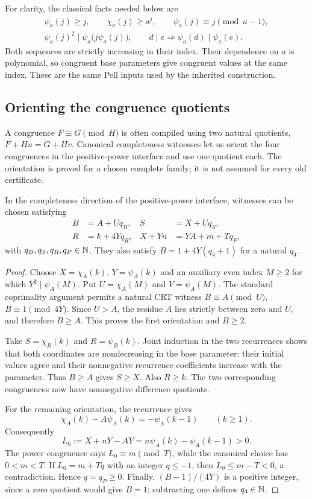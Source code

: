 For clarity, the classical facts needed below are
\begin{gather}
 \psi_a(j)\geq j,\qquad \chi_a(j)\geq a^j,\qquad
 \psi_a(j)\equiv j\pmod{a-1},\label{eq:sa-classical-bounds}\\
 \psi_a(j)^2\mid\psi_a\bigl(j\psi_a(j)\bigr),\qquad
 d\mid e\Longrightarrow\psi_a(d)\mid\psi_a(e).
 \label{eq:sa-classical-divisibility}
\end{gather}
Both sequences are strictly increasing in their index.  Their dependence
on $a$ is polynomial, so
congruent base parameters give congruent values at the same index.
These are the same Pell inputs used by the inherited construction.

\subsection{Orienting the congruence quotients}

A congruence $F\equiv G\pmod H$ is often compiled using two natural
quotients, $F+Hu=G+Hv$.  Canonical completeness witnesses let us orient
the four congruences in the positive-power interface and use one quotient
each.  The orientation is proved for a chosen complete family; it is not
assumed for every old certificate.

\begin{lemma}
\label{lem:sa-orientation}
In the completeness direction of the positive-power interface, witnesses
can be chosen satisfying
\begin{align*}
 B&=A+Uq_B,&S&=X+Uq_S,\\
 R&=k+4Yq_R,&X+Yn&=YA+m+Tq_P,
\end{align*}
with $q_B,q_S,q_R,q_P\in\mathbb N$.  They also satisfy
$B=1+4Y(q_4+1)$ for a natural $q_4$.
\end{lemma}

\begin{proof}
Choose $X=\chi_A(k)$, $Y=\psi_A(k)$ and an auxiliary even index
$M\geq2$ for which $Y^2\mid\psi_A(M)$.  Put
$U=\chi_A(M)$ and $V=\psi_A(M)$.  The standard coprimality argument
permits a natural CRT witness $B\equiv A\pmod U$,
$B\equiv1\pmod{4Y}$.  Since $U>A$, the residue $A$ lies strictly
between zero and $U$, and therefore $B\geq A$.
This proves the first orientation and $B\geq2$.

Take $S=\chi_B(k)$ and $R=\psi_B(k)$.  Joint induction in the two
recurrences shows that both coordinates are nondecreasing in the base
parameter: their initial values agree and their nonnegative recurrence
coefficients increase with the parameter.  Thus $B\geq A$ gives
$S\geq X$.  Also $R\geq k$.  The two corresponding congruences now
have nonnegative difference quotients.

For the remaining orientation, the recurrence gives
\[
 \chi_A(k)-A\psi_A(k)=-\psi_A(k-1)\qquad(k\geq1).
\]
Consequently
\[
 L_0:=X+nY-AY=n\psi_A(k)-\psi_A(k-1)>0.
\]
The power congruence says $L_0\equiv m\pmod T$, while the canonical
choice has $0<m<T$.  If $L_0=m+Tq$ with an integer $q\leq-1$, then
$L_0\leq m-T<0$, a contradiction.  Hence $q=q_P\geq0$.
Finally, $(B-1)/(4Y)$ is a positive integer, since a zero quotient
would give $B=1$; subtracting one defines $q_4\in\mathbb N$.
\end{proof}

